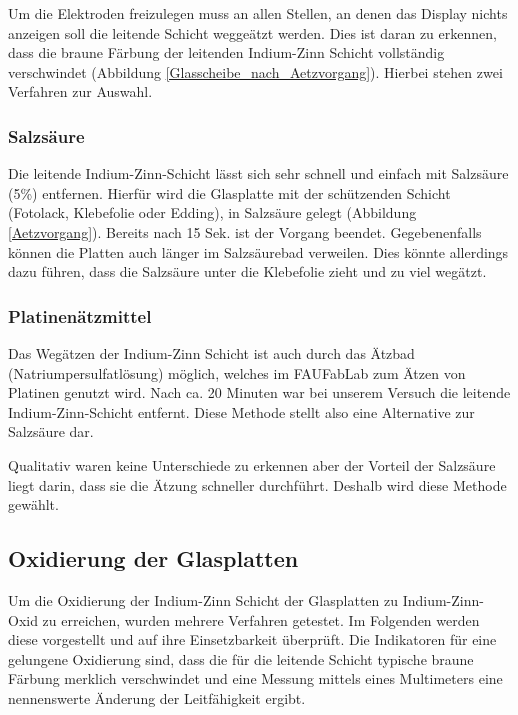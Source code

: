 Um die Elektroden freizulegen muss an allen Stellen, an denen das Display nichts anzeigen soll die leitende Schicht weggeätzt werden. Dies ist daran zu erkennen, dass die braune Färbung der leitenden Indium-Zinn Schicht vollständig verschwindet (Abbildung \ref{Glasscheibe_nach_Aetzvorgang}). Hierbei stehen zwei Verfahren zur Auswahl.\\

\subsubsection*{Salzsäure}

Die leitende Indium-Zinn-Schicht lässt sich sehr schnell und einfach mit Salzsäure (5\%) entfernen. Hierfür wird die Glasplatte mit der schützenden Schicht (Fotolack, Klebefolie oder Edding), in Salzsäure gelegt (Abbildung \ref{Aetzvorgang}). Bereits nach 15 Sek. ist der Vorgang beendet. Gegebenenfalls können die Platten auch länger im Salzsäurebad verweilen. Dies könnte allerdings dazu führen, dass die Salzsäure unter die Klebefolie zieht und zu viel wegätzt.

\subsubsection*{Platinenätzmittel}
Das Wegätzen der Indium-Zinn Schicht ist auch durch das Ätzbad (Natriumpersulfatlösung) möglich, welches im FAUFabLab zum Ätzen von Platinen genutzt wird. Nach ca. 20 Minuten war bei unserem Versuch die leitende Indium-Zinn-Schicht entfernt. Diese Methode stellt also eine Alternative zur Salzsäure dar.

Qualitativ waren keine Unterschiede zu erkennen aber der Vorteil der Salzsäure liegt darin, dass sie die Ätzung schneller durchführt. Deshalb wird diese Methode gewählt.

\subsection{Oxidierung der Glasplatten}


Um die Oxidierung der Indium-Zinn Schicht der Glasplatten zu Indium-Zinn-Oxid zu erreichen, wurden mehrere Verfahren getestet. Im Folgenden werden diese vorgestellt und auf ihre Einsetzbarkeit überprüft.
Die Indikatoren für eine gelungene Oxidierung sind, dass die für die leitende Schicht typische braune Färbung merklich verschwindet und eine Messung mittels eines Multimeters eine nennenswerte Änderung der Leitfähigkeit ergibt.

